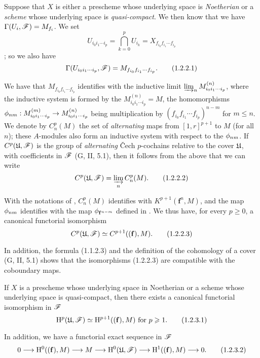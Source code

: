 \begin{env}[1.2.2]
\label{3.1.2.2}
Suppose that $X$ is either a prescheme whose underlying space is \emph{Noetherian} or a \emph{scheme} whose underlying space is \emph{quasi-compact}.
We then know  that we have $\Gamma(U_i,\mathscr{F})=M_{f_i}$.
We set
\[
  U_{i_0 i_1\cdots i_p}=\bigcap_{k=0}^p U_{i_k}=X_{f_{i_0}f_{i_1}\cdots f_{i_p}}
\]
; so we also have
\[
  \Gamma(U_{i_0 i_1\cdots i_p},\mathscr{F})=M_{f_{i_0}f_{i_1}\cdots f_{i_p}}.
  \tag{1.2.2.1}
\]

We have  that $M_{f_{i_0}f_{i_1}\cdots f_{i_p}}$ identifies with the inductive limit $\varinjlim_n M_{i_0 i_1\cdots i_p}^{(n)}$, where the inductive system is formed by the $M_{i_0 i_1\cdots i_p}^{(n)}=M$, the homomorphisms $\vphi_{nm}:M_{i_0 i_1\cdots i_p}^{(m)}\to M_{i_0 i_1\cdots i_p}^{(n)}$ being multiplication by $(f_{i_0}f_{i_1}\cdots f_{i_p})^{n-m}$ for $m\leq n$.
We denote by $C_n^p(M)$ the set of \emph{alternating} maps from $[1,r]^{p+1}$ to $M$ (for all $n$); these $A$-modules also form an inductive system with respect to the $\phi_{nm}$.
If $C^p(\mathfrak{U},\mathscr{F})$ is the group of \emph{alternating} \v Cech $p$-cochains relative to the cover $\mathfrak{U}$, with coefficients in $\mathscr{F}$ (G, II, 5.1), then it follows from the above that we can write
\[
  C^p(\mathfrak{U},\mathscr{F})=\varinjlim_n C_n^p(M).
  \tag{1.2.2.2}
\]

With the notations of , $C_n^p(M)$ identifies with $K^{p+1}(\mathbf{f}^n,M)$, and the map $\phi_{nm}$ identifies with the map $\phi_{\mathbf{f}^{n-m}}$ defined in .
We thus have, for every $p\geq 0$, a canonical functorial isomorphism
\[
  C^p(\mathfrak{U},\mathscr{F})\simeq C^{p+1}((\mathbf{f}),M).
  \tag{1.2.2.3}
\]

In addition, the formula (1.1.2.3) and the definition of the cohomology of a cover (G, II, 5.1) shows that the isomorphisms (1.2.2.3) are compatible with the coboundary maps.
\end{env}

\begin{prop}[1.2.3]
\label{3.1.2.3}
If $X$ is a prescheme whose underlying space in Noetherian or a scheme whose underlying space is quasi-compact, then there exists a canonical functorial isomorphism in $\mathscr{F}$
\[
  \mathrm{H}^p(\mathfrak{U},\mathscr{F})\simeq\mathrm{H}^{p+1}((\mathbf{f}),M)\text{ for }p\geqslant 1.
  \tag{1.2.3.1}
\]

In addition, we have a functorial exact sequence in $\mathscr{F}$
\[
  0\to\HH^0((\mathbf{f}),M)\to M\to\HH^0(\fk{U},\sh{F})\to\HH^1((\mathbf{f}),M)\to 0.
  \tag{1.2.3.2}
\]
\end{prop}

